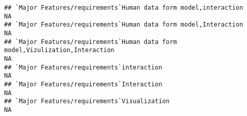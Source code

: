 \documentclass[]{article}
\begin{document}
\begin{verbatim}
## `Major Features/requirements`Human data form model,interaction                                                                                                                                                                                                                                                                                                                                                                                                                          NA
## `Major Features/requirements`Human data form model,Interaction                                                                                                                                                                                                                                                                                                                                                                                                                          NA
## `Major Features/requirements`Human data form model,Vizulization,Interaction                                                                                                                                                                                                                                                                                                                                                                                                             NA
## `Major Features/requirements`interaction                                                                                                                                                                                                                                                                                                                                                                                                                                                NA
## `Major Features/requirements`Interaction                                                                                                                                                                                                                                                                                                                                                                                                                                                NA
## `Major Features/requirements`Visualization                                                                                                                                                                                                                                                                                                                                                                                                                                              NA

\end{verbatim}
\end{document}
